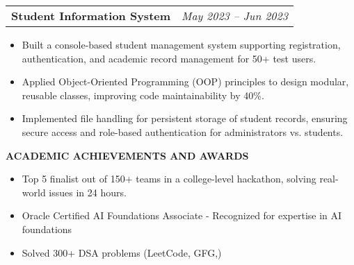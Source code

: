 \documentclass[10pt]{article}
\makeatletter
\newcommand{\sectionheader}[1]{%
  \vspace{6pt}%
  \noindent\colorbox{sectiongray}{%
    \parbox[c][10pt]{\dimexpr\textwidth-2\fboxsep}{%
      \vspace*{\fill}%
      {\fontsize{10}{12}\selectfont\bfseries\MakeUppercase{#1}}%
      \vspace*{\fill}%
    }%
  }%
  \vspace{6pt}%
}
\newcommand{\projectentry}[4]{%
  \begin{tabularx}{\textwidth}{@{}X r@{}}
    {\fontsize{10}{12}\selectfont\bfseries #1} \quad{\fontsize{8}{10}\selectfont #2} & {\fontsize{8.5}{11}\selectfont\itshape #4} \\
  \end{tabularx}
  \vspace{-9.5pt}
  #3
  \vspace{5pt}
}
\makeatother
\begin{document}
\projectentry{Student Information System}{C++, OOP, File Handling}{
\begin{itemize}
  \item Built a console-based student management system supporting registration, authentication, and academic record management for 50+ test users.
  \item Applied Object-Oriented Programming (OOP) principles to design modular, reusable classes, improving code maintainability by 40\%.
  \item Implemented file handling for persistent storage of student records, ensuring secure access and role-based authentication for administrators vs. students.
\end{itemize}
}{May 2023 -- Jun 2023}




\sectionheader{Academic Achievements and Awards}

\begin{itemize}
  \item Top 5 finalist out of 150+ teams in a college-level hackathon, solving real-world issues in 24 hours.
  \item Oracle Certified AI Foundations Associate - Recognized for expertise in AI foundations
  \item  Solved 300+ DSA problems (LeetCode, GFG,)
\end{itemize}


\end{document}
